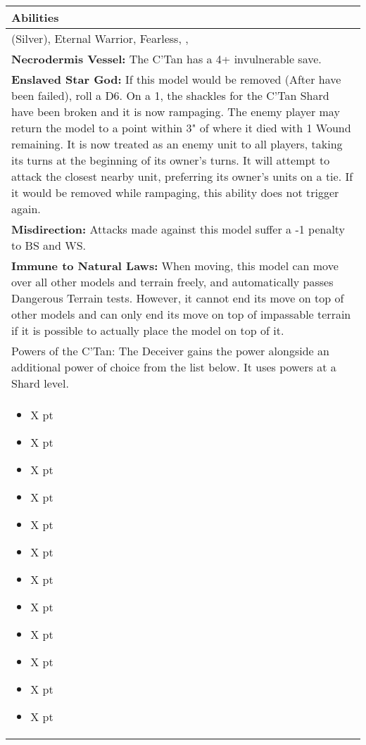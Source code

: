 \noindent
\begin{tabular}{||m{532pt}||}
	\hline
	Abilities \\
	\hline
	\quickref{Awakening Protocols} (Silver), Eternal Warrior, Fearless, \quickref{Living Metal}, \quickref{Reanimation Protocols} \\
	\textbf{Necrodermis Vessel:} The C'Tan has a 4+ invulnerable save. \\
	\textbf{Enslaved Star God:} If this model would be removed (After \quickref{Reanimation Protocols} have been failed), roll a D6. On a 1, the shackles for the C'Tan Shard have been broken and it is now rampaging. The enemy player may return the model to a point within 3" of where it died with 1 Wound remaining. It is now treated as an enemy unit to all players, taking its turns at the beginning of its owner's turns. It will attempt to attack the closest nearby unit, preferring its owner's units on a tie. If it would be removed while rampaging, this ability does not trigger again. \\
	\textbf{Misdirection:} Attacks made against this model suffer a -1 penalty to BS and WS. \\
	\textbf{Immune to Natural Laws:} When moving, this model can move over all other models and terrain 	freely, and automatically passes Dangerous Terrain tests. However, it 	cannot end its move on top of other models and can only end its move on top of impassable terrain if it is possible to actually place the model on top of it. \\
	Powers of the C'Tan: The Deceiver gains the \quickref{Grand Illusion} power alongside an additional power of choice from the list below. It uses powers at a Shard level. \\
	\begin{itemize}
		\item \quickref{Antimatter Meteor} \hrulefill X pt
		\item \quickref{Cosmic Fire} \hrulefill X pt
		\item \quickref{Entropic Touch} \hrulefill X pt
		\item \quickref{Moulder of Worlds} \hrulefill X pt
		\item \quickref{Pyreshards} \hrulefill X pt
		\item \quickref{Sentient Singularity} \hrulefill X pt
		\item \quickref{Seismic Assault} \hrulefill X pt
		\item \quickref{Sky of Falling Stars} \hrulefill X pt
		\item \quickref{Swarm of Spirit Dust} \hrulefill X pt
		\item \quickref{Time's Arrow} \hrulefill X pt
		\item \quickref{Transdimensional Thunderbolt} \hrulefill X pt
		\item \quickref{Withering Worldscape} \hrulefill X pt
	\end{itemize} \\
	\hline
\end{tabular}




